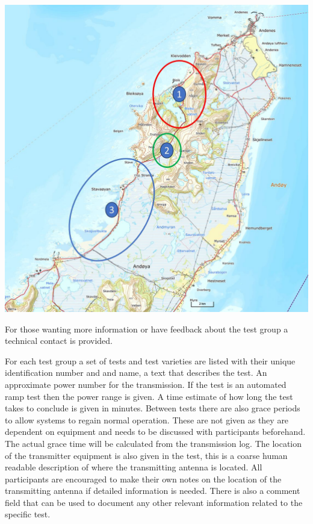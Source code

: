 \documentclass[a4paper]{book}
\begin{document}
\includegraphics[scale=0.4]{graphics/locations.png}

For those wanting more information or have feedback about the test group a technical contact is provided. 

For each test group a set of tests and test varieties are listed with their unique identification number and and name, a text that describes the test. An approximate power number for the transmission. If the test is an automated ramp test then the power range is given. A time estimate of how long the test takes to conclude is given in minutes. Between tests there are also grace periods to allow systems to regain normal operation. These are not given as they are dependent on equipment and needs to be discussed with participants beforehand. The actual grace time will be calculated from the transmission log. The location of the transmitter equipment is also given in the test, this is a coarse human readable description of where the transmitting antenna is located. All participants are encouraged to make their own notes on the location of the transmitting antenna if detailed information is needed. There is also a comment field that can be used to document any other relevant information related to the specific test. 


\end{document}
